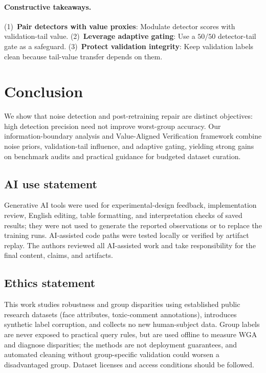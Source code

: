 \documentclass{article}
\begin{document}
\paragraph{Constructive takeaways.}
(1)~\textbf{Pair detectors with value proxies}: Modulate detector scores with validation-tail value. (2)~\textbf{Leverage adaptive gating}: Use a $50/50$ detector-tail gate as a safeguard. (3)~\textbf{Protect validation integrity}: Keep validation labels clean because tail-value transfer depends on them.

\section{Conclusion}
\label{sec:conclusion}

We show that noise detection and post-retraining repair are distinct objectives: high detection precision need not improve worst-group accuracy. Our information-boundary analysis and Value-Aligned Verification framework combine noise priors, validation-tail influence, and adaptive gating, yielding strong gains on benchmark audits and practical guidance for budgeted dataset curation.

\subsection*{AI use statement}
Generative AI tools were used for experimental-design feedback, implementation review, English editing, table formatting, and interpretation checks of saved results; they were not used to generate the reported observations or to replace the training runs. AI-assisted code paths were tested locally or verified by artifact replay. The authors reviewed all AI-assisted work and take responsibility for the final content, claims, and artifacts.

\subsection*{Ethics statement}
This work studies robustness and group disparities using established public research datasets (face attributes, toxic-comment annotations), introduces synthetic label corruption, and collects no new human-subject data. Group labels are never exposed to practical query rules, but are used offline to measure WGA and diagnose disparities; the methods are not deployment guarantees, and automated cleaning without group-specific validation could worsen a disadvantaged group. Dataset licenses and access conditions should be followed.
\end{document}
